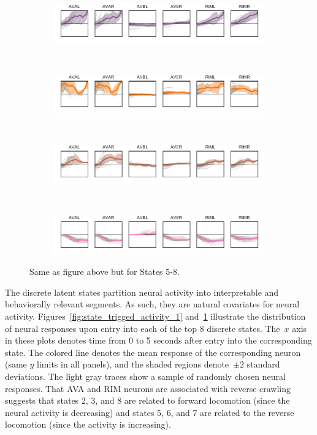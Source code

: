 \documentclass{article}
\begin{document}
\begin{figure}[t]
  \centering%
  \begin{subfigure}[b]{5.5in}
    \includegraphics[width=\textwidth]{neural_responses_subset_4.pdf}
  \end{subfigure} \\
  \begin{subfigure}[b]{5.5in}
    \includegraphics[width=\textwidth]{neural_responses_subset_5.pdf}
  \end{subfigure} \\
  \begin{subfigure}[b]{5.5in}
    \includegraphics[width=\textwidth]{neural_responses_subset_6.pdf}
  \end{subfigure}\\
  \begin{subfigure}[b]{5.5in}
    \includegraphics[width=\textwidth]{neural_responses_subset_7.pdf}
  \end{subfigure}
  \caption{Same as figure above but for States 5-8.}
  \label{fig:state_trigged_activity_2}
\end{figure}

The discrete latent states partition neural activity into interpretable
and behaviorally relevant segments. As such, they are natural covariates
for neural activity. Figures~\ref{fig:state_trigged_activity_1}
and~\ref{fig:state_trigged_activity_2} illustrate the distribution of
neural responses upon entry into each of the top 8 discrete states.
The~$x$ axis in these plots denotes time from 0 to 5
seconds after entry into the corresponding state. The colored line
denotes the mean response of the corresponding neuron (same $y$ limits
in all panels), and the shaded regions denote~$\pm 2$ standard deviations.
The light gray traces show a sample of randomly chosen neural responses.
That AVA and RIM neurons are associated with reverse crawling suggests
that states 2, 3, and 8 are related to forward locomotion (since the neural
activity is decreasing) and states 5, 6, and 7 are related to the
reverse locomotion (since the activity is increasing). 
\end{document}
